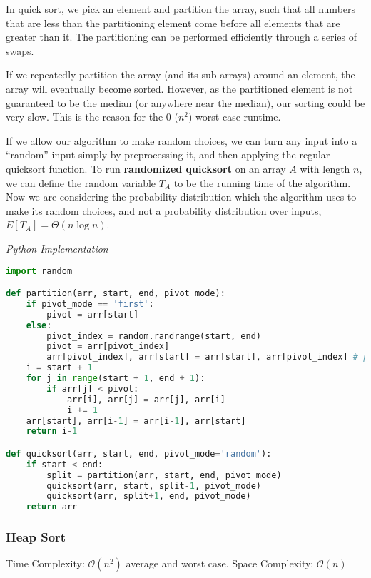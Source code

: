 \documentclass{article}
\newcommand{\bigO}{\ensuremath{\mathcal{O}}}
\begin{document}
     In quick sort, we pick an element and partition the array, such that all numbers that are less than the partitioning element come before all elements that are greater than it. The partitioning can be performed efficiently through a series of swaps.

    If we repeatedly partition the array (and its sub-arrays) around an element, the array will eventually become sorted. However, as the partitioned element is not guaranteed to be the median (or anywhere near the median), our sorting could be very slow. This is the reason for the 0 ($n^2$) worst case runtime.
    
    If we allow our algorithm to make random choices, we can turn any input into a “random” input simply by preprocessing it, and then applying the regular quicksort function. To run \textbf{randomized quicksort} on an array $A$ with length $n$, we can define the random variable $T_A$ to be the running time of the algorithm. Now we are considering the probability distribution which the algorithm uses to make its random choices, and not a probability distribution over inputs, $E[T_A] = \Theta(n \log{n})$.
    
\vspace{8pt} \emph{Python Implementation}
\begin{lstlisting}[language=Python]
import random

def partition(arr, start, end, pivot_mode):
	if pivot_mode == 'first':
		pivot = arr[start]
	else:
		pivot_index = random.randrange(start, end)
		pivot = arr[pivot_index]
		arr[pivot_index], arr[start] = arr[start], arr[pivot_index] # place the pivot at the start
	i = start + 1
	for j in range(start + 1, end + 1):
		if arr[j] < pivot:
			arr[i], arr[j] = arr[j], arr[i]
			i += 1
	arr[start], arr[i-1] = arr[i-1], arr[start]
	return i-1

def quicksort(arr, start, end, pivot_mode='random'):
	if start < end:
		split = partition(arr, start, end, pivot_mode)
		quicksort(arr, start, split-1, pivot_mode)
		quicksort(arr, split+1, end, pivot_mode)
	return arr
\end{lstlisting}
    
    \subsubsection{Heap Sort}
    Time Complexity: $\bigO(n^2)$ average and worst case. Space Complexity: $\bigO (n)$
    
\end{document}
